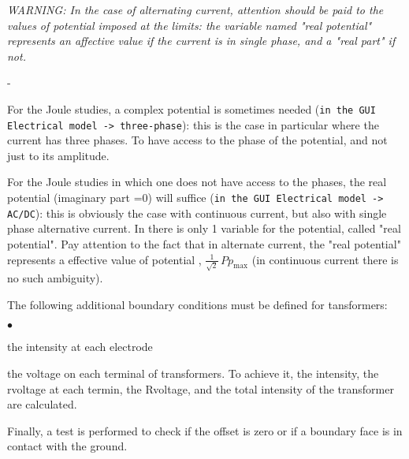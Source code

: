  {\em WARNING: In the case of alternating current, attention should be paid to the values of potential
 imposed at the limits: the variable named "real potential" represents an affective
 value if the current is in single phase, and a "real part" if not.}
\begin{list}{-}{}
\item For the Joule studies, a complex potential is sometimes needed
 (\texttt{in the GUI Electrical model -> three-phase}): this is the  case in particular where the current
 has three phases. To have access to the phase of the potential, and not just to its
 amplitude.

\item For the Joule studies in which one does not have access to the phases, the real
 potential (imaginary part =0) will suffice (\texttt{in the GUI Electrical model -> AC/DC}): this is
 obviously the case with
 continuous current, but also with single phase alternative current. In \CS
there is only 1 variable for the potential,  called "real potential". Pay attention to
 the fact that in alternate current, the "real potential" represents a effective value
 of potential , $\frac{1}{\sqrt{2}}\,Pp_\text{max}$ (in continuous current there is no
 such ambiguity).
\end{list}


The following additional boundary conditions must be defined for tansformers:
\begin{list}{$\bullet$}{}
\item  the intensity at each electrode
\item  the voltage on each terminal of transformers. To achieve it, the intensity,
 the rvoltage at each termin, the Rvoltage, and the total intensity of the
transformer are calculated.
\end{list}

Finally, a test is performed to check if the offset is zero or if a boundary
 face is in contact with the ground.



